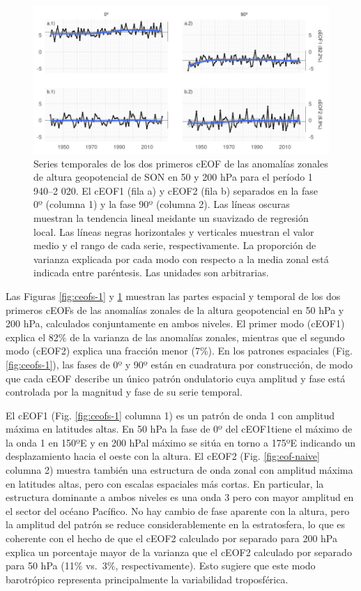 \documentclass[12pt,oneside,a4paper]{reedthesis}
\begin{document}
\begin{figure}

{\centering \includegraphics{figures/20-ceofs/extended-series-1} 

}

\caption{Series temporales de los dos primeros cEOF de las anomalías zonales de altura geopotencial de SON en 50 y 200 hPa para el período 1 940--2 020. El cEOF1 (fila a) y cEOF2 (fila b) separados en la fase 0º (columna 1) y la fase 90º (columna 2). Las líneas oscuras muestran la tendencia lineal meidante un suavizado de regresión local. Las líneas negras horizontales y verticales muestran el valor medio y el rango de cada serie, respectivamente. La proporción de varianza explicada por cada modo con respecto a la media zonal está indicada entre paréntesis. Las unidades son arbitrarias.}\label{fig:extended-series}
\end{figure}

Las Figuras \ref{fig:ceofs-1} y \ref{fig:extended-series} muestran las partes espacial y temporal de los dos primeros cEOFs de las anomalías zonales de la altura geopotencial en 50 hPa y 200 hPa, calculados conjuntamente en ambos niveles.
El primer modo (cEOF1) explica el 82\% de la varianza de las anomalías zonales, mientras que el segundo modo (cEOF2) explica una fracción menor (7\%).
En los patrones espaciales (Fig. \ref{fig:ceofs-1}), las fases de 0º y 90º están en cuadratura por construcción, de modo que cada cEOF describe un único patrón ondulatorio cuya amplitud y fase está controlada por la magnitud y fase de su serie temporal.

El cEOF1 (Fig. \ref{fig:ceofs-1} columna 1) es un patrón de onda 1 con amplitud máxima en latitudes altas.
En 50 hPa la fase de 0º del cEOF1tiene el máximo de la onda 1 en 150ºE y en 200 hPal máximo se sitúa en torno a 175ºE indicando un desplazamiento hacia el oeste con la altura.
El cEOF2 (Fig. \ref{fig:eof-naive} columna 2) muestra también una estructura de onda zonal con amplitud máxima en latitudes altas, pero con escalas espaciales más cortas.
En particular, la estructura dominante a ambos niveles es una onda 3 pero con mayor amplitud en el sector del océano Pacífico.
No hay cambio de fase aparente con la altura, pero la amplitud del patrón se reduce considerablemente en la estratosfera, lo que es coherente con el hecho de que el cEOF2 calculado por separado para 200 hPa explica un porcentaje mayor de la varianza que el cEOF2 calculado por separado para 50 hPa (11\% vs.~3\%, respectivamente).
Esto sugiere que este modo barotrópico representa principalmente la variabilidad troposférica.
\end{document}
